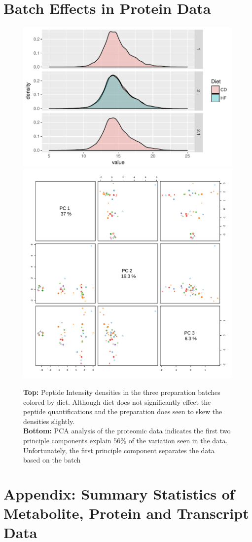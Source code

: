 \documentclass[a4paper]{book}
\begin{document}
\begin{subappendices}
\section{Batch Effects in Protein Data}
\begin{figure}[ht!b]
	\centering
	\includegraphics[width=0.7\linewidth]{3.Proteomics/protein_batch_effect_figure.pdf}
	\includegraphics[width=0.7\linewidth]{"3.Proteomics/Proteomics PCA"}
	\caption{ \textbf{Top:} Peptide Intensity densities in the three preparation batches colored by diet. Although diet does not significantly effect the peptide quantifications and the preparation does seen to skew the densities slightly. \\ \textbf{Bottom: } PCA analysis of the proteomic data indicates the first two principle components explain 56\% of the variation seen in the data. Unfortunately, the first principle component separates the data based on the batch}
	\label{fig:Proteomics Batch Effects PCA}
\end{figure}

\section{Appendix: Summary Statistics of Metabolite, Protein and Transcript Data}


\end{subappendices}
\end{document}
